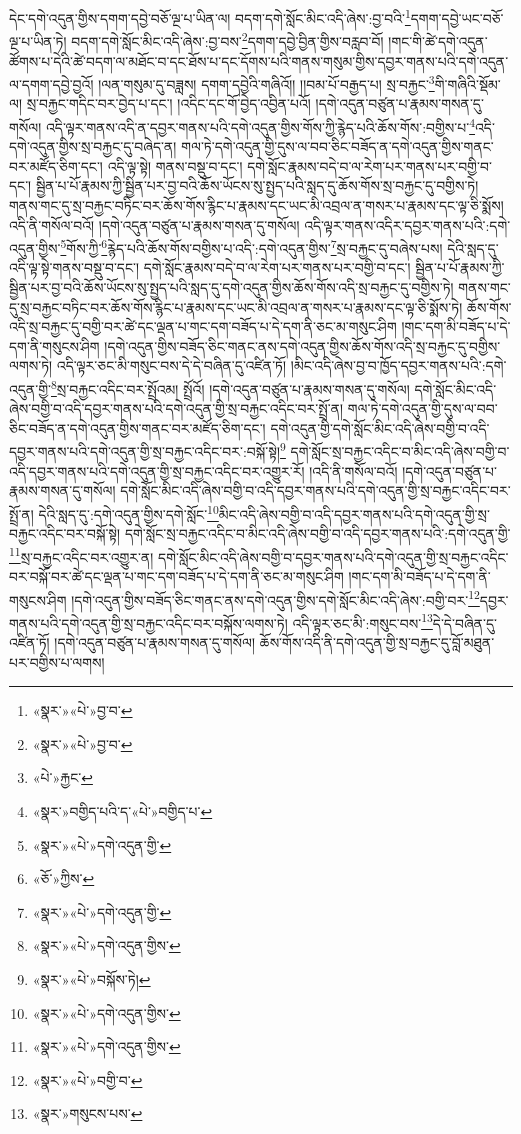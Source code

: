 དེང་དགེ་འདུན་གྱིས་དགག་དབྱེ་བཅོ་ལྔ་པ་ཡིན་ལ། བདག་དགེ་སློང་མིང་འདི་ཞེས་:བྱ་བའི་\footnote{«སྣར་»«པེ་»བྱ་བ་}དགག་དབྱེ་ཡང་བཅོ་ལྔ་པ་ཡིན་ཏེ། བདག་དགེ་སློང་མིང་འདི་ཞེས་:བྱ་བས་\footnote{«སྣར་»«པེ་»བྱ་བ་}དགག་དབྱེ་བྱིན་གྱིས་བརླབ་བོ། །གང་གི་ཚེ་དགེ་འདུན་ཚོགས་པ་དེའི་ཚེ་བདག་ལ་མཐོང་བ་དང་ཐོས་པ་དང་དོགས་པའི་གནས་གསུམ་གྱིས་དབྱར་གནས་པའི་དགེ་འདུན་ལ་དགག་དབྱེ་བྱའོ། །ལན་གསུམ་དུ་བཟླས། དགག་དབྱེའི་གཞིའོ།། །།བམ་པོ་བརྒྱད་པ། སྲ་བརྐྱང་\footnote{«པེ་»རྐྱང་}གི་གཞིའི་སྡོམ་ལ། སྲ་བརྐྱང་གདིང་བར་བྱེད་པ་དང་། །འདིང་དང་གོ་བྱེད་འབྱིན་པའོ། །དགེ་འདུན་བཙུན་པ་རྣམས་གསན་དུ་གསོལ། འདི་ལྟར་གནས་འདི་ན་དབྱར་གནས་པའི་དགེ་འདུན་གྱིས་གོས་ཀྱི་རྙེད་པའི་ཆོས་གོས་:བགྱིས་པ་\footnote{«སྣར་»བགྱིད་པའི་ད་«པེ་»བགྱིད་པ་}འདི་དགེ་འདུན་གྱིས་སྲ་བརྐྱང་དུ་བཞེད་ན། གལ་ཏེ་དགེ་འདུན་གྱི་དུས་ལ་བབ་ཅིང་བཟོད་ན་དགེ་འདུན་གྱིས་གནང་བར་མཛོད་ཅིག་དང་། འདི་ལྟ་སྟེ། གནས་བསྡུ་བ་དང་། དགེ་སློང་རྣམས་བདེ་བ་ལ་རེག་པར་གནས་པར་བགྱི་བ་དང་། སྦྱིན་པ་པོ་རྣམས་ཀྱི་སྦྱིན་པར་བྱ་བའི་ཆོས་ཡོངས་སུ་སྤྱད་པའི་སླད་དུ་ཆོས་གོས་སྲ་བརྐྱང་དུ་བགྱིས་ཏེ། གནས་གང་དུ་སྲ་བརྐྱང་བཏིང་བར་ཆོས་གོས་རྙིང་པ་རྣམས་དང་ཡང་མི་འབྲལ་ན་གསར་པ་རྣམས་དང་ལྟ་ཅི་སྨོས། འདི་ནི་གསོལ་བའོ། །དགེ་འདུན་བཙུན་པ་རྣམས་གསན་དུ་གསོལ། འདི་ལྟར་གནས་འདིར་དབྱར་གནས་པའི་:དགེ་འདུན་གྱིས་\footnote{«སྣར་»«པེ་»དགེ་འདུན་གྱི་}གོས་ཀྱི་\footnote{«ཅོ་»ཀྱིས་}རྙེད་པའི་ཆོས་གོས་བགྱིས་པ་འདི་:དགེ་འདུན་གྱིས་\footnote{«སྣར་»«པེ་»དགེ་འདུན་གྱི་}སྲ་བརྐྱང་དུ་བཞེས་པས། དེའི་སླད་དུ་འདི་ལྟ་སྟེ་གནས་བསྡུ་བ་དང་། དགེ་སློང་རྣམས་བདེ་བ་ལ་རེག་པར་གནས་པར་བགྱི་བ་དང་། སྦྱིན་པ་པོ་རྣམས་ཀྱི་སྦྱིན་པར་བྱ་བའི་ཆོས་ཡོངས་སུ་སྤྱད་པའི་སླད་དུ་དགེ་འདུན་གྱིས་ཆོས་གོས་འདི་སྲ་བརྐྱང་དུ་བགྱིས་ཏེ། གནས་གང་དུ་སྲ་བརྐྱང་བཏིང་བར་ཆོས་གོས་རྙིང་པ་རྣམས་དང་ཡང་མི་འབྲལ་ན་གསར་པ་རྣམས་དང་ལྟ་ཅི་སྨོས་ཏེ། ཆོས་གོས་འདི་སྲ་བརྐྱང་དུ་བགྱི་བར་ཚེ་དང་ལྡན་པ་གང་དག་བཟོད་པ་དེ་དག་ནི་ཅང་མ་གསུང་ཤིག །གང་དག་མི་བཟོད་པ་དེ་དག་ནི་གསུངས་ཤིག །དགེ་འདུན་གྱིས་བཟོད་ཅིང་གནང་ནས་དགེ་འདུན་གྱིས་ཆོས་གོས་འདི་སྲ་བརྐྱང་དུ་བགྱིས་ལགས་ཏེ། འདི་ལྟར་ཅང་མི་གསུང་བས་དེ་དེ་བཞིན་དུ་འཛིན་ཏོ། །མིང་འདི་ཞེས་བྱ་བ་ཁྱོད་དབྱར་གནས་པའི་:དགེ་འདུན་གྱི་\footnote{«སྣར་»«པེ་»དགེ་འདུན་གྱིས་}སྲ་བརྐྱང་འདིང་བར་སྤྲོའམ། སྤྲོའོ། །དགེ་འདུན་བཙུན་པ་རྣམས་གསན་དུ་གསོལ། དགེ་སློང་མིང་འདི་ཞེས་བགྱི་བ་འདི་དབྱར་གནས་པའི་དགེ་འདུན་གྱི་སྲ་བརྐྱང་འདིང་བར་སྤྲོ་ན། གལ་ཏེ་དགེ་འདུན་གྱི་དུས་ལ་བབ་ཅིང་བཟོད་ན་དགེ་འདུན་གྱིས་གནང་བར་མཛོད་ཅིག་དང་། དགེ་འདུན་གྱི་དགེ་སློང་མིང་འདི་ཞེས་བགྱི་བ་འདི་དབྱར་གནས་པའི་དགེ་འདུན་གྱི་སྲ་བརྐྱང་འདིང་བར་:བསྐོ་སྟེ།\footnote{«སྣར་»«པེ་»བསྐོས་ཏེ།} དགེ་སློང་སྲ་བརྐྱང་འདིང་བ་མིང་འདི་ཞེས་བགྱི་བ་འདི་དབྱར་གནས་པའི་དགེ་འདུན་གྱི་སྲ་བརྐྱང་འདིང་བར་འགྱུར་རོ། །འདི་ནི་གསོལ་བའོ། །དགེ་འདུན་བཙུན་པ་རྣམས་གསན་དུ་གསོལ། དགེ་སློང་མིང་འདི་ཞེས་བགྱི་བ་འདི་དབྱར་གནས་པའི་དགེ་འདུན་གྱི་སྲ་བརྐྱང་འདིང་བར་སྤྲོ་ན། དེའི་སླད་དུ་:དགེ་འདུན་གྱིས་དགེ་སློང་\footnote{«སྣར་»«པེ་»དགེ་འདུན་གྱིས་}མིང་འདི་ཞེས་བགྱི་བ་འདི་དབྱར་གནས་པའི་དགེ་འདུན་གྱི་སྲ་བརྐྱང་འདིང་བར་བསྐོ་སྟེ། དགེ་སློང་སྲ་བརྐྱང་འདིང་བ་མིང་འདི་ཞེས་བགྱི་བ་འདི་དབྱར་གནས་པའི་:དགེ་འདུན་གྱི་\footnote{«སྣར་»«པེ་»དགེ་འདུན་གྱིས་}སྲ་བརྐྱང་འདིང་བར་འགྱུར་ན། དགེ་སློང་མིང་འདི་ཞེས་བགྱི་བ་དབྱར་གནས་པའི་དགེ་འདུན་གྱི་སྲ་བརྐྱང་འདིང་བར་བསྐོ་བར་ཚེ་དང་ལྡན་པ་གང་དག་བཟོད་པ་དེ་དག་ནི་ཅང་མ་གསུང་ཤིག །གང་དག་མི་བཟོད་པ་དེ་དག་ནི་གསུངས་ཤིག །དགེ་འདུན་གྱིས་བཟོད་ཅིང་གནང་ནས་དགེ་འདུན་གྱིས་དགེ་སློང་མིང་འདི་ཞེས་:བགྱི་བར་\footnote{«སྣར་»«པེ་»བགྱི་བ་}དབྱར་གནས་པའི་དགེ་འདུན་གྱི་སྲ་བརྐྱང་འདིང་བར་བསྐོས་ལགས་ཏེ། འདི་ལྟར་ཅང་མི་:གསུང་བས་\footnote{«སྣར་»གསུངས་པས་}དེ་དེ་བཞིན་དུ་འཛིན་ཏོ། །དགེ་འདུན་བཙུན་པ་རྣམས་གསན་དུ་གསོལ། ཆོས་གོས་འདི་ནི་དགེ་འདུན་གྱི་སྲ་བརྐྱང་དུ་བློ་མཐུན་པར་བགྱིས་པ་ལགས། 